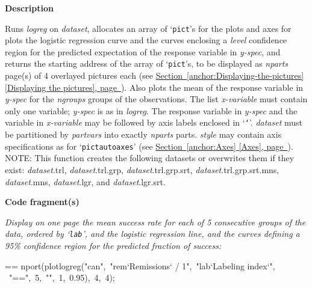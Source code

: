 \documentclass{book}
\makeatletter
\newcommand\Texinfocommandstyletextvar[1]{{\normalfont{}\textsl{#1}}}%
\newenvironment{Texinfopreformatted}{%
  \par\GNUTobeylines\obeyspaces\frenchspacing\parskip=\z@\parindent=\z@}{}
{\catcode`\^^M=13 \gdef\GNUTobeylines{\catcode`\^^M=13 \def^^M{\null\par}}}
\newenvironment{Texinfoindented}{\begin{list}{}{}\item\relax}{\end{list}}
\renewcommand{\_}{\Texinfounderscore\discretionary{}{}{}}
\makeatother
\begin{document}
\noindent{}\textbf{Description}

Runs \Texinfocommandstyletextvar{logreg} on \Texinfocommandstyletextvar{dataset},
allocates an array of `\texttt{pict}'s for the plots and axes for
plots the logistic regression curve and the curves enclosing a
\Texinfocommandstyletextvar{level} confidence region for the predicted expectation of
the response variable in
\Texinfocommandstyletextvar{y-spec}, and returns the starting address of the array of `\texttt{pict}'s,
to be displayed
as \Texinfocommandstyletextvar{nparts} page(s) of 4 overlayed pictures each (see \hyperref[anchor:Displaying-the-pictures]{Section~\ref*{anchor:Displaying-the-pictures} [Displaying the pictures], page~\pageref*{anchor:Displaying-the-pictures}}).
Also plots the mean of the response variable in \Texinfocommandstyletextvar{y-spec} for the
\Texinfocommandstyletextvar{ngroups} groups of the observations.
The list \Texinfocommandstyletextvar{x-variable} must contain only one variable;
\Texinfocommandstyletextvar{y-spec} is as in \Texinfocommandstyletextvar{logreg}.
The response variable in \Texinfocommandstyletextvar{y-spec} and the variable in \Texinfocommandstyletextvar{x-variable}
may be followed by axis labels enclosed in `\texttt{`}'.
\Texinfocommandstyletextvar{dataset} must be partitioned by \Texinfocommandstyletextvar{partvars} into exactly \Texinfocommandstyletextvar{nparts} parts.
\Texinfocommandstyletextvar{style} may contain axis specifications as for `\texttt{pict\_autoaxes}'
(see \hyperref[anchor:Axes]{Section~\ref*{anchor:Axes} [Axes], page~\pageref*{anchor:Axes}}).
NOTE: This function creates the following datasets or overwrites them if
they exist: \Texinfocommandstyletextvar{dataset}.trl, \Texinfocommandstyletextvar{dataset}.trl.grp,
\Texinfocommandstyletextvar{dataset}.trl.grp.srt, \Texinfocommandstyletextvar{dataset}.trl.grp.srt.mns, \Texinfocommandstyletextvar{dataset}.mns,
\Texinfocommandstyletextvar{dataset}.lgr, and \Texinfocommandstyletextvar{dataset}.lgr.srt.

\noindent{}\textbf{Code fragment(s)}

\emph{Display on one page the mean success rate for each
of 5 consecutive groups of the data, ordered by `\texttt{lab}',
and the logistic regression line,
and the curves defining a 95\% confidence region for the predicted
fraction of success:}
\begin{Texinfoindented}
\begin{Texinfopreformatted}%
\ttfamily nport(plotlogreg("can",\ "rem`Remissions` / 1",\ "lab`Labeling index`",
\                 "==",\ 5,\ "",\ 1,\ 0.95),\ 4,\ 4);
\end{Texinfopreformatted}
\end{Texinfoindented}
\end{document}
